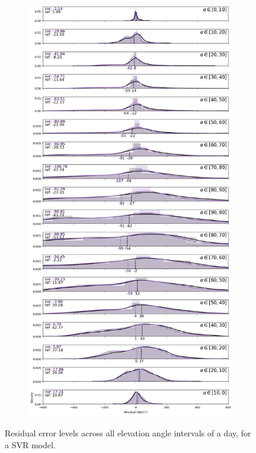 \begin{figure}[htb!]
\begin{subfigure}{\columnwidth}
    \end{subfigure}
\medskip
    \begin{subfigure}{\columnwidth}
        \includegraphics[width=\columnwidth]{figures/first_study/residual_errors_svr_site4_mae.png}
    \end{subfigure}
    \caption[]{Residual error levels across all elevation angle intervals of a day, for a SVR model.}
\end{figure}



